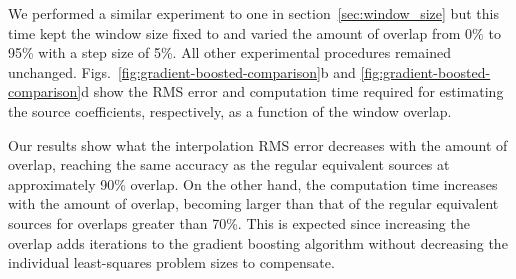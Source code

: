 \documentclass[twocolumn]{article}
\begin{document}
We performed a similar experiment to one in section~\ref{sec:window_size} but
this time kept the window size fixed to \BoostOverlappingWindowSize{} and
varied the amount of overlap from 0\% to 95\% with a step size of 5\%.
All other experimental procedures remained unchanged.
Figs.~\ref{fig:gradient-boosted-comparison}b and
\ref{fig:gradient-boosted-comparison}d show the RMS error and computation time
required for estimating the source coefficients, respectively, as a function of
the window overlap.

Our results show what the interpolation RMS error decreases with the amount of
overlap, reaching the same accuracy as the regular equivalent sources at
approximately 90\% overlap.
On the other hand, the computation time increases with the amount of overlap,
becoming larger than that of the regular equivalent sources for overlaps
greater than 70\%.
This is expected since increasing the overlap adds iterations to the gradient
boosting algorithm without decreasing the individual least-squares problem
sizes to compensate.
\end{document}
